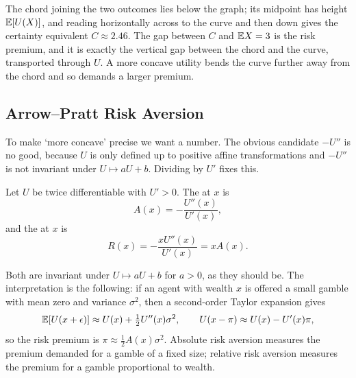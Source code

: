 \documentclass[a4paper]{scrartcl}
\begin{document}
\begin{center}
\end{center}

The chord joining the two outcomes lies below the graph; its midpoint has height $\mathbb{E}[U(X)]$, and reading horizontally across to the curve and then down gives the certainty equivalent $C \approx 2.46$. The gap between $C$ and $\mathbb{E} X = 3$ is the risk premium, and it is exactly the vertical gap between the chord and the curve, transported through $U$. A more concave utility bends the curve further away from the chord and so demands a larger premium.

\subsection{Arrow--Pratt Risk Aversion}

To make `more concave' precise we want a number. The obvious candidate $-U''$ is no good, because $U$ is only defined up to positive affine transformations and $-U''$ is not invariant under $U \mapsto aU + b$. Dividing by $U'$ fixes this.

\begin{definition}
	Let $U$ be twice differentiable with $U' > 0$. The  at $x$ is
	$$
	A(x) = -\frac{U''(x)}{U'(x)},
	$$
	and the  at $x$ is
	$$
	R(x) = -\frac{xU''(x)}{U'(x)} = xA(x).
	$$
\end{definition}

Both are invariant under $U \mapsto aU + b$ for $a > 0$, as they should be. The interpretation is the following: if an agent with wealth $x$ is offered a small gamble with mean zero and variance $\sigma^2$, then a second-order Taylor expansion gives
$$
\mathbb{E}[U(x + \epsilon)] \approx U(x) + \tfrac12 U''(x)\sigma^2, \qquad U(x - \pi) \approx U(x) - U'(x)\pi,
$$
so the risk premium is $\pi \approx \tfrac12 A(x)\sigma^2$. Absolute risk aversion measures the premium demanded for a gamble of a fixed size; relative risk aversion measures the premium for a gamble proportional to wealth.
\end{document}
